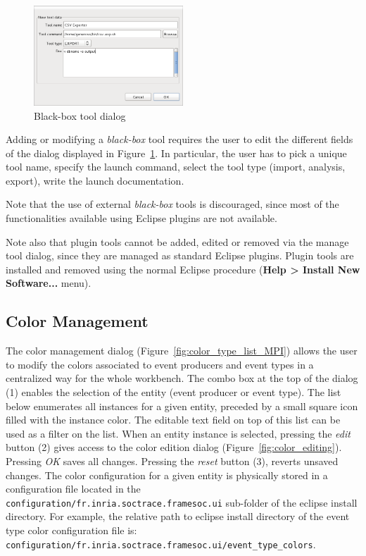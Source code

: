 \documentclass[twoside]{article}
\begin{document}
\begin{sloppypar}
\begin{figure}[h!]
  \centering
    \includegraphics[width=0.5\textwidth]{images/blackbox.png}
  \caption{Black-box tool dialog}
  \label{fig:blackbox}
\end{figure}

Adding or modifying a \emph{black-box} tool requires the user to edit the different fields of the dialog displayed in Figure~\ref{fig:blackbox}.
In particular, the user has to pick a unique tool name, specify the launch command, select the tool type (import, analysis, export), write the launch documentation.

Note that the use of external \emph{black-box} tools is discouraged, since most of the functionalities available using Eclipse plugins are not available.

Note also that plugin tools cannot be added, edited or removed via the manage tool dialog, since they are managed as standard Eclipse plugins.
Plugin tools are installed and removed using the normal Eclipse procedure (\textbf{Help > Install New Software...} menu). 

\subsection{Color Management}
\label{subsec:colors}

The color management dialog (Figure~\ref{fig:color_type_list_MPI}) allows the user to modify the colors associated to event producers and event types in a centralized way for the whole workbench.
The combo box at the top of the dialog (\num{1}) enables the selection of the entity (event producer or event type).
The list below enumerates all instances for a given entity, preceded by a small square icon filled with the instance color.
The editable text field on top of this list can be used as a filter on the list.
When an entity instance is selected, pressing the \emph{edit} button (\num{2}) gives access to the color edition dialog (Figure~\ref{fig:color_editing}).
Pressing \emph{OK} saves all changes.
Pressing the \emph{reset} button (\num{3}), reverts unsaved changes.
The color configuration for a given entity is physically stored in a configuration file located in the \texttt{configuration/fr.inria.soctrace.framesoc.ui} sub-folder of the eclipse install directory.
For example, the relative path to eclipse install directory of the event type color configuration file is:
\texttt{configuration/fr.inria.soctrace.framesoc.ui/event\_type\_colors}.


\end{sloppypar}
\end{document}
